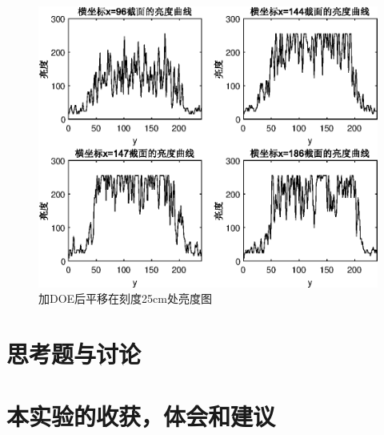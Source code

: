 \documentclass[UTF8]{ctexart}
\begin{document}
	\begin{figure} [h]
		\centering
		\includegraphics{addDOEmoveCCD25.eps}
		\caption{加DOE后平移在刻度25cm处亮度图}\label{fig-addDOEmoveCCD25}
	\end{figure}
	
	\section{思考题与讨论}
	\section{本实验的收获，体会和建议}
\end{document}
